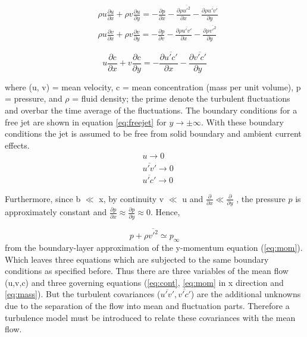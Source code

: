 \begin{equation}
\begin{split}
    & \rho u\frac{\partial u}{\partial x} + \rho v \frac{\partial u}{\partial y} = - \frac{\partial p}{\partial x} - \frac{\partial \rho \overline{u'^2}}{\partial x} - \frac{\partial \rho \overline{u'v'}}{\partial y} \\
    & \rho u\frac{\partial v}{\partial x} + \rho v \frac{\partial v}{\partial y} = - \frac{\partial p}{\partial v} - \frac{\partial \rho \overline{u'v'}}{\partial x} - \frac{\partial \rho \overline{v'^2}}{\partial y}
    \end{split}
    \label{eq:mom}
\end{equation}

\begin{equation}
  u \frac{\partial c}{\partial x} + v \frac{\partial c}{\partial y} = - \frac{\partial \overline{u'c'}}{\partial x} - \frac{\partial \overline{v'c'}}{\partial y}
    \label{eq:mass}
\end{equation} 

\noindent where (u, v) = mean velocity, c = mean concentration (mass per unit volume), p = pressure, and $\rho$ = fluid density; the prime denote the turbulent fluctuations and overbar the time average of the fluctuations. The boundary conditions for a free jet are shown in equation \ref{eq:freejet} for $y \rightarrow \pm \infty$. With these boundary conditions the jet is assumed to be free from solid boundary and ambient current effects.
\begin{equation}
\begin {split}
   &u \rightarrow 0  \\
 &\overline{u'v'} \rightarrow 0 \\
 &\overline{u'c'} \rightarrow 0 
    \end{split}
    \label{eq:freejet}
\end{equation}

\noindent Furthermore, since b $\ll$ x, by continuity v $\ll$ u and $\frac{\partial}{\partial x} \ll \frac{\partial }{\partial y}$ , the
pressure $p$ is approximately constant and $\frac{\partial p}{\partial x} \approx \frac{\partial p}{\partial y} \approx 0$. Hence, 

\begin{equation}
    p + \rho \overline{v'^2} \simeq p_\infty
\end{equation}
from the boundary-layer approximation of the y-momentum equation (\ref{eq:mom}). Which leaves three equations which are subjected to the same boundary conditions as specified before. Thus there are three variables of the mean flow (u,v,c) and three governing equations (\ref{eq:cont}, \ref{eq:mom} in x direction and \ref{eq:mass}). But the turbulent covariances ($\overline{u'v'}, \overline{v'c'}$) are the additional unknowns due to the separation of the flow into mean and fluctuation parts. Therefore a turbulence model must be introduced to relate these covariances with the mean flow. \newline


